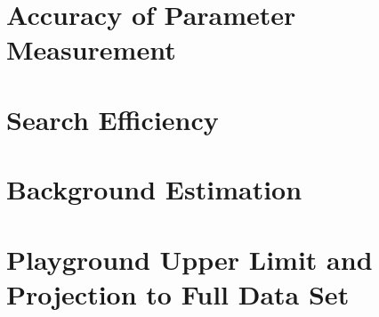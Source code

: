 \section{Accuracy of Parameter Measurement}
\label{ss:s2parameters}

\section{Search Efficiency}
\label{ss:s2efficiency}

\section{Background Estimation}
\label{s:s2background}

\section{Playground Upper Limit and Projection to Full Data Set}
\label{s:s2upperlimit}























\newpage

